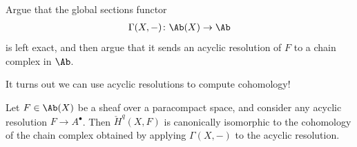 \documentclass[11pt]{book}
\begin{document}
\begin{exercise}\label{exer:global-sections-left-exact} 
Argue that the global sections functor
\begin{align*}
    \Gamma(X,-) \colon \Ab(X) \to \Ab
\end{align*}
is left exact, and then argue that it sends an acyclic resolution of $F$ to a chain complex in $\Ab$.
\end{exercise}

It turns out we can use acyclic resolutions to compute cohomology!

\begin{theorem}[\v{C}ech=sheaf cohomology] 
\label{thm:cech-equals-sheaf}
Let $F\in \Ab(X)$ be a sheaf over a paracompact space, and consider any acyclic resolution $F \to A^\bullet$. Then $\check{H}^q(X,F)$ is canonically isomorphic to the cohomology of the chain complex obtained by applying $\Gamma(X,-)$ to the acyclic resolution.
\end{theorem}
\end{document}
